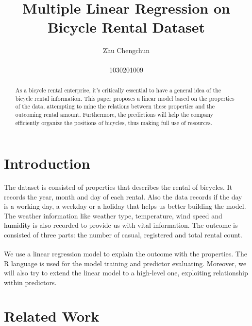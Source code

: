 \documentclass{article}[]
\begin{document}
\title{{\bf Multiple Linear Regression on Bicycle Rental Dataset}\\ }

\author{Zhu Chengchun\\ \vspace{0.5cm}\\
 1030201009}

\date{}
\maketitle
\begin{abstract}
As a bicycle rental enterprise, it's critically essential to have a general idea of the bicycle rental information. This paper proposes a linear model based on the properties of the data, attempting to mine the relations between these properties and the outcoming rental amount. Furthermore, the predictions will help the company efficiently organize the positions of bicycles, thus making full use of resources.
\end{abstract}

\section{Introduction}
\label{intro}
\paragraph{}
The dataset is consisted of properties that describes the rental of bicycles. It records the year, month and day of each rental. Also the data records if the day is a working day, a weekday or a holiday that helps us better building the model. The weather information like weather type, temperature, wind speed and humidity is also recorded to provide us with vital information. The outcome is consisted of three parts: the number of casual, registered and total rental count.
\paragraph{}
We use a linear regression model to explain the outcome with the properties. The R language is used for the model training and predictor evaluating. Moreover, we will also try to extend the linear model to a high-level one, exploiting relationship within predictors.

\section{Related Work}
\label{related_work}
\end{document}
